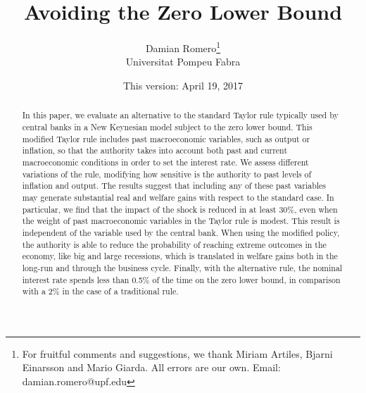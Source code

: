 \documentclass[11pt]{article}
\title{Avoiding the Zero Lower Bound}
\author{Damian Romero\thanks{For fruitful comments and suggestions, we thank Miriam Artiles, Bjarni Einarsson and Mario Giarda. All errors are our own. Email: damian.romero@upf.edu}\\Universitat Pompeu Fabra}
\date{This version: April 19, 2017}
\numberwithin{equation}{section}
\begin{document}
	
\maketitle

\begin{abstract}
\noindent In this paper, we evaluate an alternative to the standard Taylor rule typically used by central banks in a New Keynesian model subject to the zero lower bound. This modified Taylor rule includes past macroeconomic variables, such as output or inflation, so that the authority takes into account both past and current macroeconomic conditions in order to set the interest rate. We assess different variations of the rule, modifying how sensitive is the authority to past levels of inflation and output. The results suggest that including any of these past variables may generate substantial real and welfare gains with respect to the standard case. In particular, we find that the impact of the shock is reduced in at least 30\%, even when the weight of past macroeconomic variables in the Taylor rule is modest. This result is independent of the variable used by the central bank. When using the modified policy, the authority is able to reduce the probability of reaching extreme outcomes in the economy, like big and large recessions, which is translated in welfare gains both in the long-run and through the business cycle. Finally, with the alternative rule, the nominal interest rate spends less than 0.5\% of the time on the zero lower bound, in comparison with a 2\% in the case of a traditional rule.
\end{abstract}	
\end{document}
